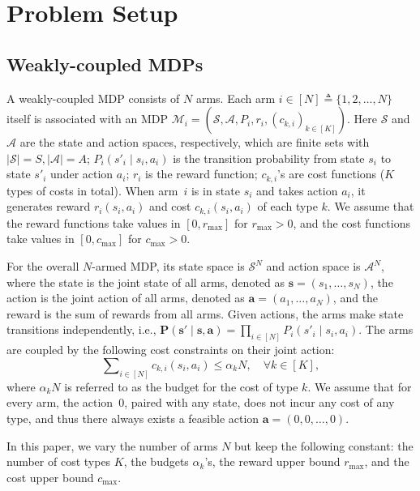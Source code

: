 \documentclass[mnsc,nonblindrev]{informs3}
\newcommand{\bp}{\bm{P}}
\newcommand{\bms}{\bm{s}}
\newcommand{\bma}{\bm{a}}
\newcommand{\States}{\mathcal{S}}
\newcommand{\Actions}{\mathcal{A}}
\begin{document}
\section{Problem Setup}

\subsection{Weakly-coupled MDPs}\label{sec:WCMDP}
A weakly-coupled MDP consists of \(N\) arms. Each arm \(i \in [N]\triangleq \{1,2,\dots,N\}\) itself is associated with an MDP \(\mathcal{M}_i = (\States, \Actions, P_i, r_i, (c_{k,i})_{k \in [K]})\).
Here \(\States\) and \(\Actions\) are the state and action spaces, respectively, which are finite sets with $|\States|=S, |\Actions|=A$; 
\(P_i(s'_i \mid s_i,a_i)\) is the transition probability from state \(s_i\) to state \(s'_i\) under action \(a_i\);
$r_i$ is the reward function; $c_{k,i}$'s are cost functions ($K$ types of costs in total). When arm~$i$ is in state $s_i$ and takes action $a_i$, it generates reward $r_i(s_i,a_i)$ and cost $c_{k,i}(s_i,a_i)$ of each type $k$.
We assume that the reward functions take values in $[0,r_{\max}]$ for $r_{\max}>0$, and the cost functions take values in $[0,c_{\max}]$ for $c_{\max}>0$. 


For the overall $N$-armed MDP, its state space is $\mathcal{S}^N$ and action space is $\mathcal{A}^N$, where the state is the joint state of all arms, denoted as $\bms=(s_1,\ldots,s_N)$,  the action is the joint action of all arms, denoted as $\bma=(a_1,\ldots,a_N)$, and the reward is the sum of rewards from all arms.
Given actions, the arms make state transitions independently, i.e., $\bp(\bms'\mid\bms,\bma) = \prod\nolimits_{i\in[N]} P_i(s'_i\mid s_i,a_i).$
The arms are coupled by the following cost constraints on their joint action:
\vspace{-0.04cm}
\[
\sum\nolimits_{i\in[N]} c_{k,i}(s_i,a_i) \le \alpha_k N, \quad \forall k\in[K],
\]
where \(\alpha_k N\) is referred to as the budget for the cost of type \(k\).
We assume that for every arm, the action~$0$, paired with any state, does not incur any cost of any type, and thus there always exists a feasible action $\bma=(0,0,\dots,0)$.

In this paper, we vary the number of arms $N$ but keep the following constant: the number of cost types $K$, the budgets $\alpha_k$'s, the reward upper bound $r_{\max}$, and the cost upper bound $c_{\max}$.
\end{document}
